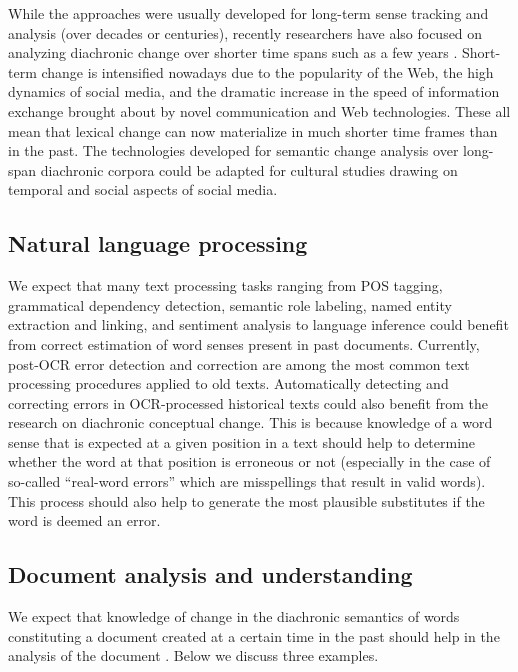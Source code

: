 \documentclass[output=paper]{langsci/langscibook}
\begin{document}
While 
 the approaches were usually developed for long-term sense tracking and analysis (over decades or centuries),
recently researchers have also focused on analyzing diachronic change over shorter time spans such as a few years \citep{dodds-etal-2011,danescu2013no,eisenstein-etal-2014,goel2016social,deltredici-fernandez-2018}. Short-term change is intensified nowadays due to the popularity of the Web, the high dynamics of social media, and the dramatic increase in the speed of information exchange brought about by novel communication and Web technologies. These all mean that lexical change can now materialize in much shorter time frames than in the past. The technologies developed for semantic change analysis over long-span diachronic corpora could be adapted for cultural studies drawing on temporal and social aspects of social media.

\subsection{Natural language processing} 
We expect that many text processing tasks ranging from POS tagging, grammatical dependency detection, semantic role labeling, named entity extraction and linking, and sentiment analysis to language inference could benefit from correct estimation of word senses present in past documents. Currently,  post-OCR error detection and correction are among the most common text processing procedures applied to old texts. Automatically detecting and correcting errors in OCR-processed historical texts \citep{chiron2017icdar2017} could also benefit from the research on diachronic conceptual change. This is because  knowledge of a word sense that is expected at a given position in a text should help to determine whether the word at that position is erroneous or not (especially in the case of so-called ``real-word errors'' which are misspellings that result in valid words). This process should also help to generate the most plausible substitutes if the word is deemed an error. 


\subsection{Document analysis and understanding}
We expect that  knowledge of change in the diachronic semantics of words constituting a document created at a certain time in the past should help in the analysis of the document \citep{tahmasebi2013models}. 
Below we discuss three examples.
\end{document}
